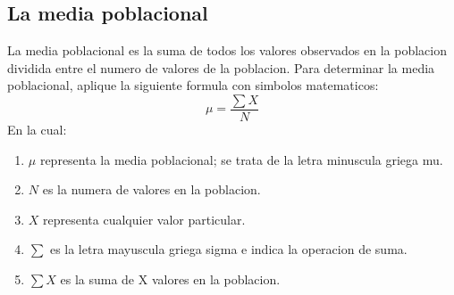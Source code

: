 \documentclass[]{article}
\begin{document}
\subsection{La media poblacional}
La media poblacional es la suma de todos los valores observados en la poblacion dividida entre el numero de valores de la poblacion. Para determinar la media poblacional, aplique la siguiente formula con simbolos matematicos:
\[ \mu=\frac{\sum X}{N} \] 
En la cual:
\begin{enumerate}
	\item $\mu$ representa la media poblacional; se trata de la letra minuscula griega mu.
	\item $N$ es la numera de valores en la poblacion.
	\item $X$ representa cualquier valor particular.
	\item $\sum$ es la letra mayuscula griega sigma e indica la operacion de suma.
	\item $\sum X$ es la suma de X valores en la poblacion.
\end{enumerate}
\end{document}

